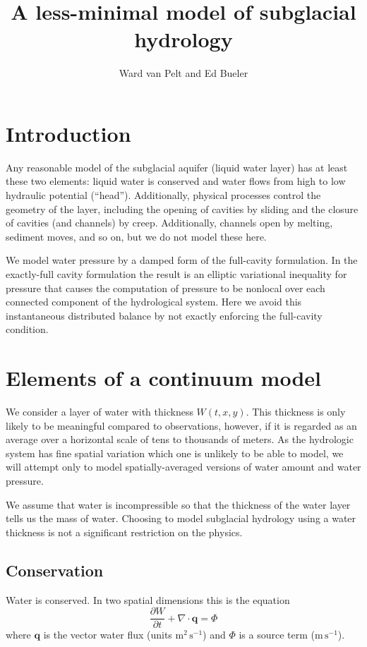 \documentclass[12pt,final]{amsart}%
\title[]{A less-minimal model of subglacial hydrology}
\author[]{Ward van Pelt and Ed Bueler}
\newcommand\bq{\mathbf{q}}
\newcommand{\Div}{\nabla\cdot}
\begin{document}
\maketitle
\thispagestyle{empty}

\section{Introduction}

Any reasonable model of the subglacial aquifer (liquid water layer) has at least these two elements: liquid water is conserved and water flows from high to low hydraulic potential  (``head'').  Additionally, physical processes control the geometry of the layer, including the opening of cavities by sliding and the closure of cavities (and channels) by creep.  Additionally, channels open by melting, sediment moves, and so on, but we do not model these here.

We model water pressure by a damped form of the full-cavity formulation.  In the exactly-full cavity formulation the result is an elliptic variational inequality \citep{Schoofetal2012} for pressure that causes the computation of pressure to be nonlocal over each connected component of the hydrological system.  Here we avoid this instantaneous distributed balance by not exactly enforcing the full-cavity condition.


\section{Elements of a continuum model}

We consider a layer of water with thickness $W(t,x,y)$.  This thickness is only likely to be meaningful compared to observations, however, if it is regarded as an average over a horizontal scale of tens to thousands of meters.  As the hydrologic system has fine spatial variation which one is unlikely to be able to model, we will attempt only to model spatially-averaged versions of water amount and water pressure.

We assume that water is incompressible so that the thickness of the water layer tells us the mass of water.  Choosing to model subglacial hydrology using a water thickness is not a significant restriction on the physics.

\subsection*{Conservation}  Water is conserved.  In two spatial dimensions this is the equation \citep{Clarke05}
\begin{equation} \label{eq:conserve}
\frac{\partial W}{\partial t} + \Div \bq = \Phi
\end{equation}
where $\bq$ is the vector water flux (units $\text{m}^2\,\text{s}^{-1}$) and $\Phi$ is a source term ($\text{m}\,\text{s}^{-1}$).
\end{document}
